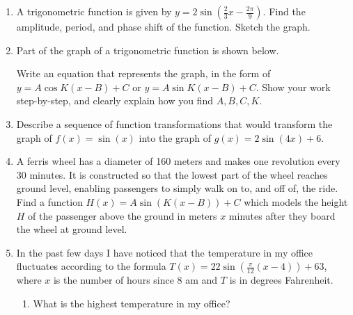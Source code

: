 \documentclass[11pt]{article}
\begin{document}
\begin{enumerate}
\item  A trigonometric function is given by $\displaystyle y=2\sin\left (\frac{2}{3}x-\frac{2\pi}{9}\right )$.  Find the amplitude, period, and phase shift of the function. Sketch the graph.

\item Part of the graph of a trigonometric function is shown below.




Write an equation that represents the graph, in the form of $\displaystyle y=A\cos K(x-B)+C$ or $\displaystyle y=A\sin K(x-B)+C$. Show your work step-by-step, and clearly explain how you find $A,B,C,K$.

\item Describe a sequence of function transformations that would transform the graph of $f(x)=\sin(x)$ into the graph of $\displaystyle g(x)=2\sin(4x)+6$.

\item A ferris wheel has a diameter of 160 meters and makes one revolution  every 30 minutes. It is constructed so that the lowest part of the wheel reaches ground level, enabling passengers to simply walk on to, and off of, the ride. Find a function $\displaystyle H(x)=A\sin(K(x-B))+C$ which models the height $H$ of the passenger above the ground in meters $x$ minutes after they board the wheel at ground level.

\item In the past few days I have noticed that the temperature in my office fluctuates according to the formula $\displaystyle T(x)=22\sin\left(\frac{\pi}{12}(x-4)\right )+63$, where $x$ is the number of hours since  8 am and $T$ is in degrees Fahrenheit.
\begin{enumerate}
\item What is the highest temperature in my office? 


\end{enumerate}
\end{enumerate}
\end{document}
